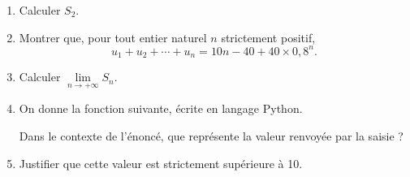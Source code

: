\begin{enumerate}
	\item Calculer $S_{2}$.
	\item Montrer que, pour tout entier naturel $n$ strictement positif, \[ u_{1}+u_{2}+\cdots+u_{n}=10 n-40+40 \times 0,8^{n}. \]
	\item Calculer $\lim\limits_{n \to +\infty} S_{n}$.
	\item On donne la fonction  suivante, écrite en langage \textsf{Python}.
	
	
	Dans le contexte de l'énoncé, que représente la valeur renvoyée par la saisie  ?
	\item Justifier que cette valeur est strictement supérieure à 10.
\end{enumerate}